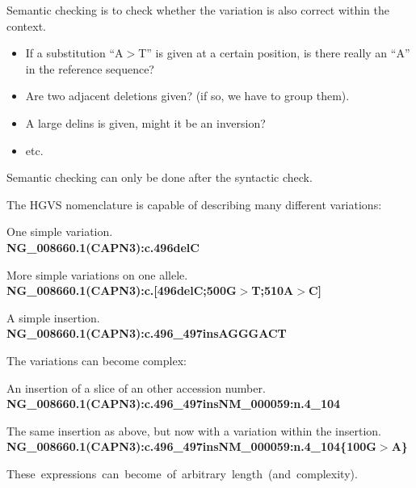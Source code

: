 \documentclass[a4, portrait]{seminar}
\providecommand{\mspace}{\vspace{0.5cm}}
\begin{document}
\begin{slide}

Semantic checking is to check whether the variation is also correct within the 
context.
\begin{itemize}
\item If a substitution ``A$>$T'' is given at a certain position, is there
      really an ``A'' in the reference sequence?
\item Are two adjacent deletions given? (if so, we have to group them).
\item A large delins is given, might it be an inversion?
\item etc.
\end{itemize}
\mspace

Semantic checking can only be done after the syntactic check.
\vfill
\end{slide}

\begin{slide}

The HGVS nomenclature is capable of describing many different variations:
\mspace

One simple variation.\\
{\bf NG\_008660.1(CAPN3):c.496delC}
\mspace

More simple variations on one allele.\\
{\bf NG\_008660.1(CAPN3):c.[496delC;500G$>$T;510A$>$C]}
\mspace

A simple insertion.\\
{\bf NG\_008660.1(CAPN3):c.496\_497insAGGGACT}
\vfill
\end{slide}

\begin{slide}

The variations can become complex:
\mspace

An insertion of a slice of an other accession number.\\
{\bf NG\_008660.1(CAPN3):c.496\_497insNM\_000059:n.4\_104}
\mspace

The same insertion as above, but now with a variation within the insertion.\\
{\bf NG\_008660.1(CAPN3):c.496\_497insNM\_000059:n.4\_104\{100G$>$A\}}
\mspace

\hbox{These expressions can become of arbitrary length (and complexity).}
\vfill
\end{slide}
\end{document}
